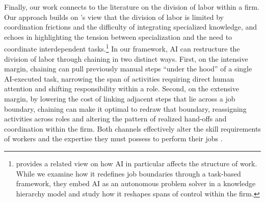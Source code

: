 Finally, our work connects to the literature on the division of labor within a firm. 
Our approach builds on \cite{becker1992division}'s view that the division of labor is limited by coordination frictions and the difficulty of integrating specialized knowledge, and echoes \cite{dessein2006adaptive} in highlighting the tension between specialization and the need to coordinate interdependent tasks.\footnote{
\cite{ide2025ai} provides a related view on how AI in particular affects the structure of work. While we examine how it redefines job boundaries through a task-based framework, they embed AI as an autonomous problem solver in a knowledge hierarchy model \citep{garicano2000hierarchies, garicano2006organization} and study how it reshapes spans of control within the firm.
}
In our framework, AI can restructure the division of labor through chaining in two distinct ways.  
First, on the intensive margin, chaining can pull previously manual steps ``under the hood'' of a single AI-executed task, narrowing the span of activities requiring direct human attention and shifting responsibility within a role. 
Second, on the extensive margin, by lowering the cost of linking adjacent steps that lie across a job boundary, chaining can make it optimal to redraw that boundary, reassigning activities across roles and altering the pattern of realized hand-offs and coordination within the firm. 
Both channels effectively alter the skill requirements of workers and the expertise they must possess to perform their jobs \citep{autor2025expertise}.